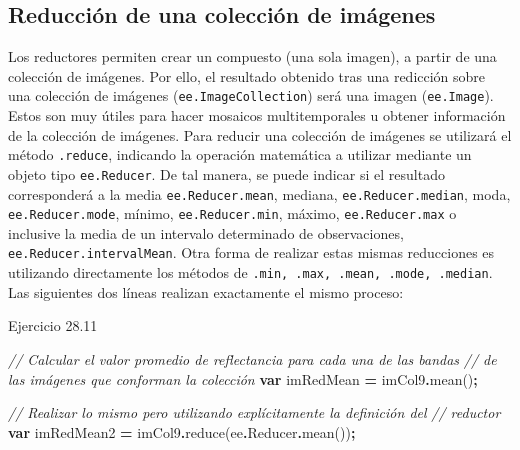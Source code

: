 \documentclass[
  12pt,
  letterpaper,
  twoside]{book}
\newenvironment{Shaded}{\begin{snugshade}}{\end{snugshade}}
\newcommand{\AttributeTok}[1]{\textcolor[rgb]{0.77,0.63,0.00}{#1}}
\newcommand{\CommentTok}[1]{\textcolor[rgb]{0.56,0.35,0.01}{\textit{#1}}}
\newcommand{\FunctionTok}[1]{\textcolor[rgb]{0.00,0.00,0.00}{#1}}
\newcommand{\KeywordTok}[1]{\textcolor[rgb]{0.13,0.29,0.53}{\textbf{#1}}}
\newcommand{\NormalTok}[1]{#1}
\newcommand{\OperatorTok}[1]{\textcolor[rgb]{0.81,0.36,0.00}{\textbf{#1}}}
\begin{document}
\hypertarget{reducciuxf3n-de-una-colecciuxf3n-de-imuxe1genes}{%
\subsection*{Reducción de una colección de imágenes}\label{reducciuxf3n-de-una-colecciuxf3n-de-imuxe1genes}}

Los reductores permiten crear un compuesto (una sola imagen), a partir de una colección de imágenes. Por ello, el resultado obtenido tras una redicción sobre una colección de imágenes (\texttt{ee.ImageCollection}) será una imagen (\texttt{ee.Image}). Estos son muy útiles para hacer mosaicos multitemporales u obtener información de la colección de imágenes. Para reducir una colección de imágenes se utilizará el método \texttt{.reduce}, indicando la operación matemática a utilizar mediante un objeto tipo \texttt{ee.Reducer}. De tal manera, se puede indicar si el resultado corresponderá a la media \texttt{ee.Reducer.mean}, mediana, \texttt{ee.Reducer.median}, moda, \texttt{ee.Reducer.mode}, mínimo, \texttt{ee.Reducer.min}, máximo, \texttt{ee.Reducer.max} o inclusive la media de un intervalo determinado de observaciones, \texttt{ee.Reducer.intervalMean}. Otra forma de realizar estas mismas reducciones es utilizando directamente los métodos de \texttt{.min,\ .max,\ .mean,\ .mode,\ .median}. Las siguientes dos líneas realizan exactamente el mismo proceso:

Ejercicio 28.11

\begin{Shaded}
\begin{Highlighting}[]
\CommentTok{// Calcular el valor promedio de reflectancia para cada una de las bandas }
\CommentTok{// de las imágenes que conforman la colección}
\KeywordTok{var}\NormalTok{ imRedMean }\OperatorTok{=}\NormalTok{ imCol9}\OperatorTok{.}\FunctionTok{mean}\NormalTok{()}\OperatorTok{;}

\CommentTok{// Realizar lo mismo pero utilizando explícitamente la definición del }
\CommentTok{// reductor}
\KeywordTok{var}\NormalTok{ imRedMean2 }\OperatorTok{=}\NormalTok{ imCol9}\OperatorTok{.}\FunctionTok{reduce}\NormalTok{(ee}\OperatorTok{.}\AttributeTok{Reducer}\OperatorTok{.}\FunctionTok{mean}\NormalTok{())}\OperatorTok{;}
\end{Highlighting}
\end{Shaded}
\end{document}
